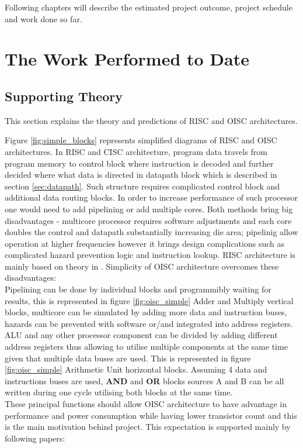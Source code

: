 \documentclass[a4paper,12pt]{article}
\begin{document}
\begin{multicols}{2}
Following chapters will describe the estimated project outcome, project schedule and work done so far.

\section{The Work Performed to Date}
\subsection{Supporting Theory} \label{sec:theory}
This section explains the theory and predictions of RISC and OISC architectures.

Figure \ref{fig:simple_blocks} represents simplified diagrams of RISC and OISC architectures. In RISC and CISC architecture, program data travels from program memory to control block where instruction is decoded and further decided where what data is directed in datapath block which is described in section \ref{sec:datapath}. Such structure requires complicated control block and additional data routing blocks. In order to increase performance of such processor one would need to add pipelining or add multiple cores. Both methods bring big disadvantages - multicore processor requires software adjustments and each core doubles the control and datapath substantially increasing die area; pipelinig allow operation at higher frequencies however it brings design complications such as complicated hazard prevention logic and instruction lookup. RISC architecture is mainly based on theory in \autocite{harris_harris_2013}. Simplicity of OISC architecture overcomes these disadvantages:
\\
Pipelining can be done by individual blocks and programmibly waiting for results, this is represented in figure \ref{fig:oisc_simple} Adder and Multiply vertical blocks, multicore can be simulated by adding more data and instruction buses, hazards can be prevented with software or/and integrated into address registers.
\\ 
ALU and any other processor component can be divided by adding different address registers thus allowing to utilise multiple components at the same time given that multiple data buses are used. This is represented in figure \ref{fig:oisc_simple} Arithmetic Unit horizontal blocks. Assuming 4 data and instructions buses are used, \textbf{AND} and \textbf{OR} blocks sources A and B can be all written during one cycle utilising both blocks at the same time.
\\
These principal functions should allow OISC architecture to have advantage in performance and power consumption while having lower transistor count and this is the main motivation behind project. This expectation is supported mainly by following papers:

\end{multicols}
\end{document}
